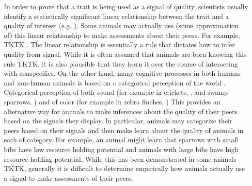 In order to prove that a trait is being used as a signal of quality, scientists usually identify a statistically significant linear relationship between the trait and a quality of interest (e.g. \citealp{Rohwer:1981vn,Rohwer:1982fk,Ripoll:2004vn,Tibbetts:2004kx}). Some animals may actually use (some approximation of) this linear relationship to make assessments about their peers. For example, TKTK . The linear relationship is essentially a rule that dictates how to infer quality from signal. While it is often assumed that animals are born knowing this rule TKTK, it is also plausible that they learn it over the course of interacting with conspecifics. On the other hand, many cognitive processes in both humans and non-human animals is based on a categorical perception of the world \citep{Harnad:1990ux}. Categorical perception of both sound (for example in crickets, \citealp{Wyttenback:1996wj}, and swamp sparrows, \citealp{Nelson:1989rt}) and of color (for example in zebra finches, \citealp{Lim:2016ye}) This provides an alternative way for animals to make inferences about the quality of their peers based on the signals they display. In particular, animals may categorize their peers based on their signals and then make learn about the quality of animals in each of category. For example, an animal might learn that sparrows with small bibs have low resource holding potential and animals with large bibs have high resource holding potential. While this has been demonstrated in some animals TKTK, generally it is difficult to determine empirically how animals actually use a signal to make assessments of their peers.   
 
 
